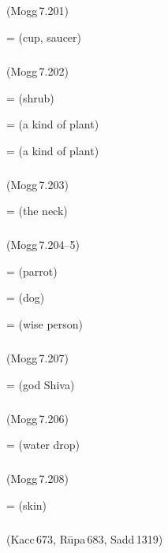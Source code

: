 \subparagraph*{} (Mogg\,7.201)\label{pacckx:aava}

 =  (cup, saucer)\par

\subparagraph*{} (Mogg\,7.202)\label{pacckx:dnuva}

 =  (shrub)\par
{} =  (a kind of plant)\par
{} =  (a kind of plant)\par

\subparagraph*{} (Mogg\,7.203)\label{pacckx:iiva}

 =  (the neck)\par

\subparagraph*{} (Mogg\,7.204--5)\label{pacckx:kva}\label{pacckx:kvaa}

 =  (parrot)\par
{} =  (dog)\par
{} =  (wise person)\par

\subparagraph*{} (Mogg\,7.207)\label{pacckx:riva}

 =  (god Shiva)\par

\subparagraph*{} (Mogg\,7.206)\label{pacckx:reva}

 =  (water drop)\par

\subparagraph*{} (Mogg\,7.208)\label{pacckx:ravi}

 =  (skin)\par

\subparagraph*{} (Kacc\,673, R\=upa\,683, Sadd\,1319)\label{pacckx:ussa}\label{pacckx:nusa}\label{pacckx:isa}

